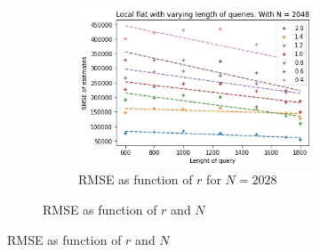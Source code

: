 \documentclass[11pt]{article}
\theoremstyle{definition}
\begin{document}
\begin{figure}[H]
\begin{subfigure}{.4\textwidth}
\begin{subfigure}{\textwidth}
  \includegraphics[width=\linewidth]{figures/local_flat/varying_r/loc_flat_varying_length_N_linear_=2048.png}
  \caption{RMSE as function of $r$ for $N=2028$}
  \label{fig:a}
\end{subfigure}
\caption{RMSE as function of $r$ and $N$}
\label{fig:b}
\end{subfigure}
\caption{RMSE as function of $r$ and $N$}
\label{fig:a}
\end{figure}
\end{document}
